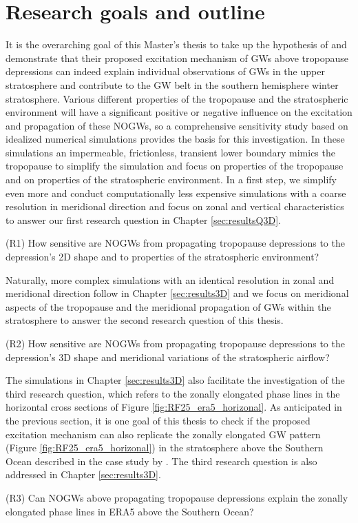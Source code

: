 \section{Research goals and outline}
\label{sec:goals}
It is the overarching goal of this Master's thesis to take up the hypothesis of \textcite[]{dornbrack_stratospheric_2022} and demonstrate that their proposed excitation mechanism of GWs above tropopause depressions can indeed explain individual observations of GWs in the upper stratosphere and contribute to the GW belt in the southern hemisphere winter stratosphere. Various different properties of the tropopause and the stratospheric environment will have a significant positive or negative influence on the excitation and propagation of these NOGWs, so a comprehensive sensitivity study based on idealized numerical simulations provides the basis for this investigation. In these simulations an impermeable, frictionless, transient lower boundary mimics the tropopause to simplify the simulation and focus on properties of the tropopause and on properties of the stratospheric environment. In a first step, we simplify even more and conduct computationally less expensive simulations with a coarse resolution in meridional direction and focus on zonal and vertical characteristics to answer our first research question in Chapter \ref{sec:resultsQ3D}.
\begin{tcolorbox}[]
    (R1) How sensitive are NOGWs from propagating tropopause depressions to the depression's 2D shape and to properties of the stratospheric environment?
\end{tcolorbox}
Naturally, more complex simulations with an identical resolution in zonal and meridional direction follow in Chapter \ref{sec:results3D} and we focus on meridional aspects of the tropopause and the meridional propagation of GWs within the stratosphere to answer the second research question of this thesis.
\begin{tcolorbox}[]
    (R2) How sensitive are NOGWs from propagating tropopause depressions to the depression's 3D shape and meridional variations of the stratospheric airflow?
\end{tcolorbox}
The simulations in Chapter \ref{sec:results3D} also facilitate the investigation of the third research question, which refers to the zonally elongated phase lines in the horizontal cross sections of Figure \ref{fig:RF25_era5_horizonal}. As anticipated in the previous section, it is one goal of this thesis to check if the proposed excitation mechanism can also replicate the zonally elongated GW pattern (Figure \ref{fig:RF25_era5_horizonal}) in the stratosphere above the Southern Ocean described in the case study by \textcite[]{dornbrack_stratospheric_2022}. The third research question is also addressed in Chapter \ref{sec:results3D}. %
\begin{tcolorbox}[]
    (R3) Can NOGWs above propagating tropopause depressions explain the zonally elongated phase lines in ERA5 above the Southern Ocean?
\end{tcolorbox}

